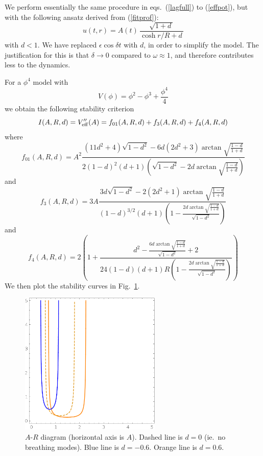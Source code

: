 \documentclass{report}
\begin{document}
We perform essentially the same procedure in eqs.~(\ref{lagfull}) to (\ref{effpot}), but with the following ansatz derived from (\ref{fitprof}):
\begin{equation}
  u(t,r) = A(t)\,\frac{\sqrt{1+d\,}}{\cosh r/R + d\,}
\end{equation}
with $d<1$. We have replaced $\epsilon\cos\delta t$ with $d$, in order to simplify the model. The justification for this is that $\delta\to 0$ compared to $\omega\approx 1$, and therefore contributes less to the dynamics.

For a $\phi^4$ model with
\begin{equation}
  V(\phi) = \phi^2 - \phi^3 + \frac{\phi^4}{4}
\end{equation}
we obtain the following stability criterion
\begin{equation}
  I(A,R,d) = V_{\rm eff}''(A) = f_{01}(A,R,d) + f_3(A,R,d) + f_4(A,R,d)
\end{equation}
where
\begin{equation}
  f_{01}(A,R,d)=A^2\frac{\left(11 d^2+4\right) \sqrt{1-d^2}-6 d \left(2 d^2+3\right) \arctan\sqrt{\frac{1-d}{1+d}}}{2 (1-d)^2 (d+1) \left(\sqrt{1-d^2}
      -2 d \arctan\sqrt{\frac{1-d}{1+d}}\right)}
\end{equation}
and
\begin{equation}
  f_3(A,R,d)=3A\frac{3 d \sqrt{1-d^2}-2 \left(2 d^2+1\right) \arctan\sqrt{\frac{1-d}{1+d}}}{(1-d)^{3/2} (d+1) \left(1-\frac{2 d \arctan\sqrt{\frac{1-d}{1+d}}}{\sqrt{1-d^2}}\right)}
\end{equation}
and
\begin{equation}
    f_4(A,R,d)=2 \left(1+\frac{d^2-\frac{6 d \arctan\sqrt{\frac{1-d}{1+d}}}{\sqrt{1-d^2}}+2}{24 (1-d) (d+1) R \left(1-\frac{2 d \arctan\sqrt{\frac{1-d}{1+d}}}{\sqrt{1-d^2}}\right)}\right)
\end{equation}
We then plot the stability curves in Fig.~\ref{stability1}.

\begin{figure}\centering
  \includegraphics[width=0.6\textwidth]{plot/small-stability.png}
  \caption{$A$-$R$ diagram (horizontal axis is $A$). Dashed line is $d=0$ (ie.~no breathing modes). Blue line is $d=-0.6$. Orange line is $d=0.6$.}\label{stability1}
\end{figure}
\end{document}
